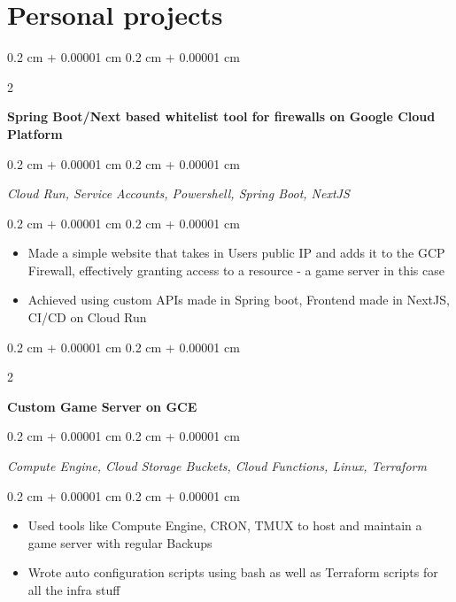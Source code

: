 \documentclass[10pt, letterpaper]{article}
\newenvironment{highlights}{
    \begin{itemize}[
        topsep=0.10 cm,
        parsep=0.10 cm,
        partopsep=0pt,
        itemsep=0pt,
        leftmargin=0.4 cm + 10pt
    ]
}{
    \end{itemize}
} %
\newenvironment{onecolentry}{
    \begin{adjustwidth}{
        0.2 cm + 0.00001 cm
    }{
        0.2 cm + 0.00001 cm
    }
}{
    \end{adjustwidth}
} %
\newenvironment{twocolentry}[2][]{
    \onecolentry
    \def\secondColumn{#2}
    \setcolumnwidth{\fill, 4.5 cm}
    \begin{paracol}{2}
}{
    \switchcolumn\raggedleft\secondColumn
    \end{paracol}
    \endonecolentry
} %
\let\hrefWithoutArrow\href
\renewcommand{\href}[2]{\hrefWithoutArrow{#1}{\ifthenelse{\equal{#2}{}}{ }{#2 }\raisebox{.15ex}{\footnotesize \faExternalLink*}}}
\begin{document}
\section{Personal projects}

\begin{twocolentry}                    {

        \textit{\href{https://github.com/apparentlyarhm/minecraft-terraform}{github}}}
    \textbf{Spring Boot/Next based whitelist tool for firewalls on Google Cloud Platform}
\end{twocolentry}
\begin{onecolentry}
    \textit{Cloud Run, Service Accounts, Powershell, Spring Boot, NextJS}

\end{onecolentry}

\vspace{0.2 cm}
\begin{onecolentry}
    \begin{highlights}
        \item {Made a simple website that takes in Users public IP and adds it to the GCP Firewall, effectively granting access to a resource - a game server in this case}
        \item {Achieved using custom APIs made in Spring boot, Frontend made in NextJS, CI/CD on Cloud Run}

    \end{highlights}
\end{onecolentry}

\vspace{0.2 cm}

\begin{twocolentry}                    {

        \textit{}}
    \textbf{Custom Game Server on GCE}
\end{twocolentry}

\begin{onecolentry}
    \textit{Compute Engine, Cloud Storage Buckets, Cloud Functions, Linux, Terraform}
\end{onecolentry}
\vspace{0.2 cm}
\begin{onecolentry}
    \begin{highlights}
        \item {Used tools like Compute Engine, CRON, TMUX to host and maintain a game server with regular Backups}
        \item Wrote auto configuration scripts using bash as well as Terraform scripts for all the
        infra stuff
    \end{highlights}
\end{onecolentry}

\vspace{0.2 cm}
\end{document}
